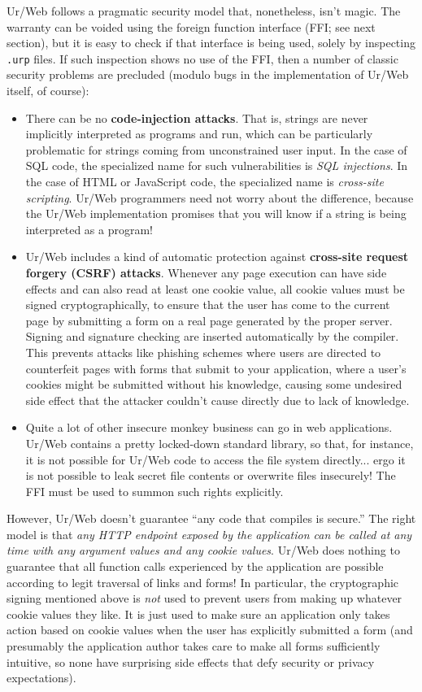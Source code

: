 \documentclass{article}
\begin{document}
Ur/Web follows a pragmatic security model that, nonetheless, isn't magic.  The warranty can be voided using the foreign function interface (FFI; see next section), but it is easy to check if that interface is being used, solely by inspecting \texttt{.urp} files.  If such inspection shows no use of the FFI, then a number of classic security problems are precluded (modulo bugs in the implementation of Ur/Web itself, of course):
\begin{itemize}
\item There can be no \textbf{code-injection attacks}.  That is, strings are never implicitly interpreted as programs and run, which can be particularly problematic for strings coming from unconstrained user input.  In the case of SQL code, the specialized name for such vulnerabilities is \emph{SQL injections}.  In the case of HTML or JavaScript code, the specialized name is \emph{cross-site scripting}.  Ur/Web programmers need not worry about the difference, because the Ur/Web implementation promises that you will know if a string is being interpreted as a program!
\item Ur/Web includes a kind of automatic protection against \textbf{cross-site request forgery (CSRF) attacks}.  Whenever any page execution can have side effects and can also read at least one cookie value, all cookie values must be signed cryptographically, to ensure that the user has come to the current page by submitting a form on a real page generated by the proper server.  Signing and signature checking are inserted automatically by the compiler.  This prevents attacks like phishing schemes where users are directed to counterfeit pages with forms that submit to your application, where a user's cookies might be submitted without his knowledge, causing some undesired side effect that the attacker couldn't cause directly due to lack of knowledge.
\item Quite a lot of other insecure monkey business can go in web applications.  Ur/Web contains a pretty locked-down standard library, so that, for instance, it is not possible for Ur/Web code to access the file system directly... ergo it is not possible to leak secret file contents or overwrite files insecurely!  The FFI must be used to summon such rights explicitly.
\end{itemize}

However, Ur/Web doesn't guarantee ``any code that compiles is secure.''  The right model is that \emph{any HTTP endpoint exposed by the application can be called at any time with any argument values and any cookie values}.  Ur/Web does nothing to guarantee that all function calls experienced by the application are possible according to legit traversal of links and forms!  In particular, the cryptographic signing mentioned above is \emph{not} used to prevent users from making up whatever cookie values they like.  It is just used to make sure an application only takes action based on cookie values when the user has explicitly submitted a form (and presumably the application author takes care to make all forms sufficiently intuitive, so none have surprising side effects that defy security or privacy expectations).
\end{document}
